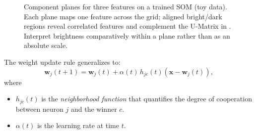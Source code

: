 \begin{figure}[t]
\caption{Component planes for three features on a trained SOM (toy data). Each plane maps one feature across the grid; aligned bright/dark regions reveal correlated features and complement the U-Matrix in . Interpret brightness comparatively within a plane rather than as an absolute scale.}
    \label{fig:lec5-som-component-planes}
\end{figure}

The weight update rule generalizes to:
\begin{equation}
\mathbf{w}_j(t+1) = \mathbf{w}_j(t) + \alpha(t) \, h_{j c}(t) \left( \mathbf{x} - \mathbf{w}_j(t) \right),
\label{eq:coop_weight_update}
\end{equation}
where
\begin{itemize}
    \item \(h_{j c}(t)\) is the \emph{neighborhood function} that quantifies the degree of cooperation between neuron \(j\) and the winner \(c\).
    \item \(\alpha(t)\) is the learning rate at time \(t\).
\end{itemize}

